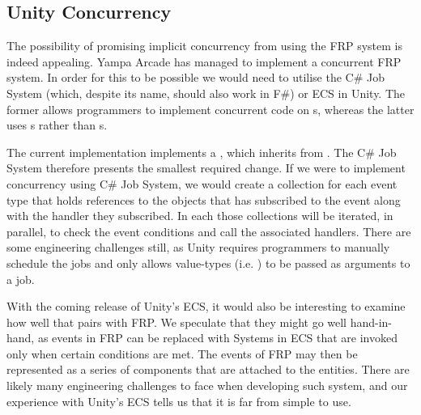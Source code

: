\subsection{Unity Concurrency}
The possibility of promising implicit concurrency from using the \gls{FRP} system is indeed appealing. Yampa Arcade has managed to implement a concurrent \gls{FRP} system\cite{courtney2003yampa}. In order for this to be possible we would need to utilise the C\# Job System (which, despite its name, should also work in F\#) or \gls{ECS} in Unity. The former allows programmers to implement concurrent code on s, whereas the latter uses s rather than s. 

The current implementation implements a , which inherits from . The C\# Job System therefore presents the smallest required change. If we were to implement concurrency using C\# Job System, we would create a collection for each event type that holds references to the objects that has subscribed to the event along with the handler they subscribed. In each  those collections will be iterated, in parallel, to check the event conditions and call the associated handlers. There are some engineering challenges still, as Unity requires programmers to manually schedule the jobs and only allows value-types (i.e. ) to be passed as arguments to a job.

With the coming release of Unity's \gls{ECS}, it would also be interesting to examine how well that pairs with \gls{FRP}. We speculate that they might go well hand-in-hand, as events in \gls{FRP} can be replaced with Systems in \gls{ECS} that are invoked only when certain conditions are met. The events of \gls{FRP} may then be represented as a series of components that are attached to the entities. There are likely many engineering challenges to face when developing such system, and our experience with Unity's \gls{ECS} tells us that it is far from simple to use.